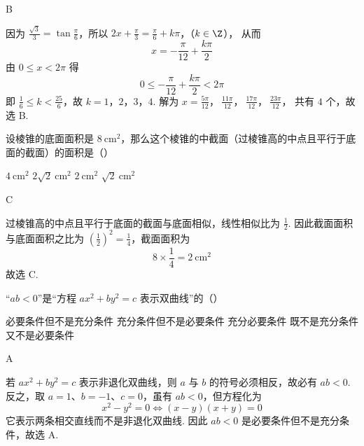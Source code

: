 \begin{answer}
B
\end{answer}

\begin{solution}
因为 \(\frac{\sqrt{3}}{3}=\tan\frac{\pi}{6}\)，所以
\(2x+\frac{\pi}{3}=\frac{\pi}{6}+k\pi\)，（\(k\in\Z\)），
从而
\[
x=-\frac{\pi}{12}+\frac{k\pi}{2}
\]
由 \(0\leqslant x<2\pi\) 得
\[
0\leqslant-\frac{\pi}{12}+\frac{k\pi}{2}<2\pi
\]
即 \(\frac{1}{6}\leqslant k<\frac{25}{6}\)，故 \(k=1\)，\(2\)，\(3\)，\(4\). 解为
\(x=\frac{5\pi}{12}\)，\(\ \frac{11\pi}{12}\)，\(\ \frac{17\pi}{12}\)，\(\ \frac{23\pi}{12}\)，
共有 \(4\) 个，故选 B.
\end{solution}

\begin{problem}
设棱锥的底面面积是 \(8\mathrm{~cm}^2\)，那么这个棱锥的中截面（过棱锥高的中点且平行于底面的截面）的面积是（\quad）

\choices
    {\(4\mathrm{~cm}^2\)}
    {\(2\sqrt{2}\mathrm{~cm}^2\)}
    {\(2\mathrm{~cm}^2\)}
    {\(\sqrt{2}\mathrm{~cm}^2\)}
\end{problem}

\begin{answer}
C
\end{answer}

\begin{solution}
过棱锥高的中点且平行于底面的截面与底面相似，线性相似比为 \(\frac{1}{2}\). 因此截面面积与底面面积之比为 \(\left(\frac{1}{2}\right)^2=\frac{1}{4}\)，截面面积为
\[
8\times\frac{1}{4}=2\mathrm{~cm}^2
\]
故选 C.
\end{solution}

\begin{problem}
“\(ab<0\)”是“方程 \(ax^2+by^2=c\) 表示双曲线”的（\quad）

\choices
    {必要条件但不是充分条件}
    {充分条件但不是必要条件}
    {充分必要条件}
    {既不是充分条件又不是必要条件}
\end{problem}

\begin{answer}
A
\end{answer}

\begin{solution}
若 \(ax^2+by^2=c\) 表示非退化双曲线，则 \(a\) 与 \(b\) 的符号必须相反，故必有 \(ab<0\). 反之，取 \(a=1\)、\(b=-1\)、\(c=0\)，虽有 \(ab<0\)，但方程化为
\[
x^2-y^2=0\iff (x-y)(x+y)=0
\]
它表示两条相交直线而不是非退化双曲线. 因此 \(ab<0\) 是必要条件但不是充分条件，故选 A.
\end{solution}

